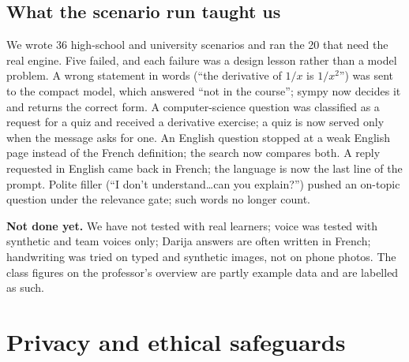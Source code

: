 \documentclass[11pt,a4paper]{article}
\begin{document}
\subsection*{What the scenario run taught us}

We wrote 36 high-school and university scenarios and ran the 20 that need the real engine. Five failed, and each
failure was a design lesson rather than a model problem. A wrong statement in words (``the derivative of $1/x$ is
$1/x^2$'') was sent to the compact model, which answered ``not in the course''; sympy now decides it and returns the
correct form. A computer-science question was classified as a request for a quiz and received a derivative exercise;
a quiz is now served only when the message asks for one. An English question stopped at a weak English page instead
of the French definition; the search now compares both. A reply requested in English came back in French; the
language is now the last line of the prompt. Polite filler (``I don't understand\ldots can you explain?'') pushed an
on-topic question under the relevance gate; such words no longer count.

\textbf{Not done yet.} We have not tested with real learners; voice was tested with synthetic and team voices only;
Darija answers are often written in French; handwriting was tried on typed and synthetic images, not on phone
photos. The class figures on the professor's overview are partly example data and are labelled as such.

\section{Privacy and ethical safeguards}
\end{document}
